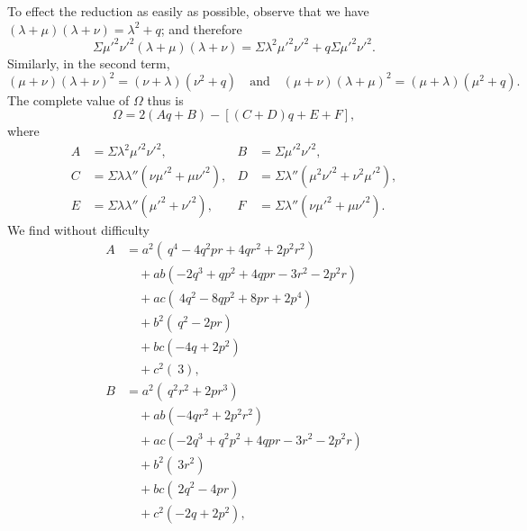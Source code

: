 \documentclass[11pt,a4paper]{article}
\begin{document}
To effect the reduction as easily as possible, observe that we have $(\lambda + \mu)(\lambda + \nu) = \lambda^2 + q$; and therefore
\[
\Sigma \mu'^2 \nu'^2 (\lambda + \mu)(\lambda + \nu) = \Sigma \lambda^2 \mu'^2 \nu'^2 + q\Sigma \mu'^2 \nu'^2.
\]
Similarly, in the second term,
\[
(\mu + \nu)(\lambda + \nu)^2 = (\nu + \lambda)(\nu^2 + q)\quad \text{and}\quad (\mu + \nu)(\lambda + \mu)^2 = (\mu + \lambda)(\mu^2 + q).
\]
The complete value of $\Omega$ thus is
\[
\Omega = 2(Aq + B) - [(C + D)q + E + F],
\]
where
\begin{align*}
A &= \Sigma \lambda^2 \mu'^2 \nu'^2, & B &= \Sigma \mu'^2 \nu'^2, \\
C &= \Sigma \lambda\lambda''(\nu\mu'^2 + \mu\nu'^2), & D &= \Sigma \lambda''(\mu^2 \nu'^2 + \nu^2 \mu'^2), \\
E &= \Sigma \lambda\lambda''(\mu'^2 + \nu'^2), & F &= \Sigma \lambda''(\nu\mu'^2 + \mu\nu'^2).
\end{align*}
We find without difficulty
\begin{align*}
A &= a^2 (\ q^4 - 4q^2 pr + 4qr^2 + 2p^2 r^2) \\
 &\quad + ab(-2q^3 + qp^2 + 4qpr - 3r^2 - 2p^2 r) \\
 &\quad + ac(\ 4q^2 - 8qp^2 + 8pr + 2p^4) \\
 &\quad + b^2 (\ q^2 - 2pr) \\
 &\quad + bc(-4q + 2p^2) \\
 &\quad + c^2 (\ 3), \\[4pt]
B &= a^2 (\ q^2 r^2 + 2pr^3) \\
 &\quad + ab(-4qr^2 + 2p^2 r^2) \\
 &\quad + ac(-2q^3 + q^2 p^2 + 4qpr - 3r^2 - 2p^2 r) \\
 &\quad + b^2 (\ 3r^2) \\
 &\quad + bc(\ 2q^2 - 4pr) \\
 &\quad + c^2 (-2q + 2p^2),
\end{align*}

\bigskip
\end{document}
